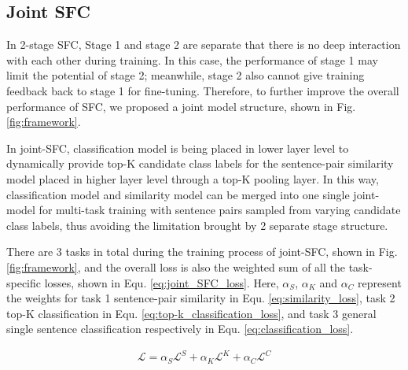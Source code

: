 \subsection{Joint SFC}
In 2-stage SFC, Stage 1 and stage 2 are separate that there is no deep
interaction with each other during training. In this case, the performance of
stage 1 may limit the potential of stage 2; meanwhile, stage 2 also cannot
give training feedback back to stage 1 for fine-tuning. Therefore, to further
improve the overall performance of SFC, we proposed a joint model structure,
shown in Fig. \ref{fig:framework}.

In joint-SFC, classification model is being placed in lower layer level to
dynamically provide top-K candidate class labels for the sentence-pair
similarity model placed in higher layer level through a top-K pooling layer.
In this way, classification model and similarity model can be merged into one
single joint-model for multi-task training with sentence pairs sampled from
varying candidate class labels, thus avoiding the limitation brought by 2
separate stage structure.

There are 3 tasks in total during the training process of joint-SFC, shown in
Fig. \ref{fig:framework}, and the overall loss is also the weighted sum of all
the task-specific losses, shown in Equ. \ref{eq:joint_SFC_loss}. Here,
$\alpha_S$, $\alpha_K$ and $\alpha_C$ represent the weights for task 1
sentence-pair similarity in Equ. \ref{eq:similarity_loss}, task 2 top-K
classification in Equ. \ref{eq:top-k_classification_loss}, and task 3 general
single sentence classification respectively in Equ.
\ref{eq:classification_loss}.

\vspace{-1.5em}
\begin{align}
  \mathcal{L} = \alpha_S \mathcal{L}^S + \alpha_K \mathcal{L}^K + \alpha_C \mathcal{L}^C
  \label{eq:joint_SFC_loss}
\end{align}
\vspace{-1.5em}
